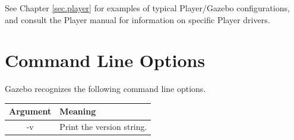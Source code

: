 \documentclass[11pt]{report}
\begin{document}
See Chapter \ref{sec.player} for examples of typical Player/Gazebo
configurations, and consult the Player manual for information on
specific Player drivers.


\section{Command Line Options}
\label{sec.cmdline}

Gazebo recognizes the following command line options.
\begin{center}
\begin{tabular}{|cl|}
\hline
\bf Argument & \bf Meaning \\ 
\hline
-v & Print the version string. \\
\hline
\end{tabular}
\end{center}




\newenvironment{xmlattrtable}[2]
  {\begin{center}\begin{tabular}{llll} \multicolumn{4}{c}{{\bf $<$#1:#2$>$}}\\ 
    \hline Attribute & Type & Default & Description \\ \hline}
  {\hline \end{tabular}\end{center}}

\newcommand{\xmlattr}[4]{{\tt $<$#1$>$} & #2 & #3 & #4\\} 
\newcommand{\modeldefaults}{
  \xmlattr{id}{string}{NULL}{Model ID string}
  \xmlattr{xyz}{3-vector}{$(0, 0, 0)$}{Model position}
  \xmlattr{rpy}{Euler angles}{$(0, 0, 0)$}{Model orientation}}


\newenvironment{bodyattrtable}
  {\begin{center}\begin{tabular}{lll}  
    \hline Name & Description \\ \hline}
  {\hline \end{tabular}\end{center}}

\newcommand{\bodyattr}[2]{{\tt #1} & #2\\} 
\newcommand{\bodydefaults}{
  \bodyattr{canonical}{The canonical (default) body.}}
\end{document}
